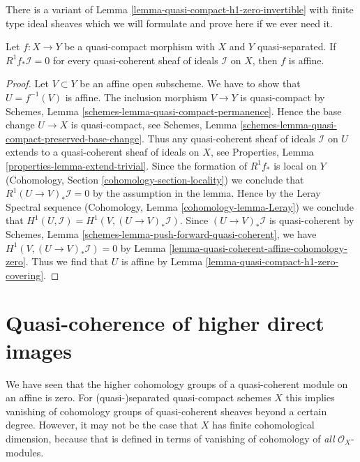\noindent
There is a variant of Lemma \ref{lemma-quasi-compact-h1-zero-invertible}
with finite type ideal sheaves which we will formulate and prove here if
we ever need it.

\begin{lemma}
\label{lemma-criterion-affine-morphism}
Let $f : X \to Y$ be a quasi-compact morphism with $X$ and $Y$ quasi-separated.
If $R^1f_*\mathcal{I} = 0$ for every quasi-coherent sheaf of ideals
$\mathcal{I}$ on $X$, then $f$ is affine.
\end{lemma}

\begin{proof}
Let $V \subset Y$ be an affine open subscheme. We have to show that
$U = f^{-1}(V)$ is affine. The inclusion morphism $V \to Y$ is quasi-compact
by Schemes, Lemma \ref{schemes-lemma-quasi-compact-permanence}.
Hence the base change $U \to X$ is quasi-compact, see
Schemes, Lemma \ref{schemes-lemma-quasi-compact-preserved-base-change}.
Thus any quasi-coherent sheaf of ideals $\mathcal{I}$ on $U$
extends to a quasi-coherent sheaf of ideals on $X$, see
Properties, Lemma \ref{properties-lemma-extend-trivial}.
Since the formation of $R^1f_*$ is local on $Y$
(Cohomology, Section \ref{cohomology-section-locality})
we conclude that $R^1(U \to V)_*\mathcal{I} = 0$ by the assumption
in the lemma. Hence by the Leray Spectral sequence
(Cohomology, Lemma \ref{cohomology-lemma-Leray})
we conclude that $H^1(U, \mathcal{I}) = H^1(V, (U \to V)_*\mathcal{I})$.
Since $(U \to V)_*\mathcal{I}$ is quasi-coherent by
Schemes, Lemma \ref{schemes-lemma-push-forward-quasi-coherent}, we have
$H^1(V, (U \to V)_*\mathcal{I}) = 0$ by
Lemma \ref{lemma-quasi-coherent-affine-cohomology-zero}.
Thus we find that $U$ is affine by
Lemma \ref{lemma-quasi-compact-h1-zero-covering}.
\end{proof}















\section{Quasi-coherence of higher direct images}
\label{section-quasi-coherence}

\noindent
We have seen that the higher cohomology groups of a quasi-coherent module on
an affine is zero. For (quasi-)separated quasi-compact schemes $X$ this implies
vanishing of cohomology groups of quasi-coherent sheaves beyond a certain
degree. However, it may not be the case that $X$ has finite cohomological
dimension, because that is defined in terms of vanishing of cohomology
of {\it all} $\mathcal{O}_X$-modules.

